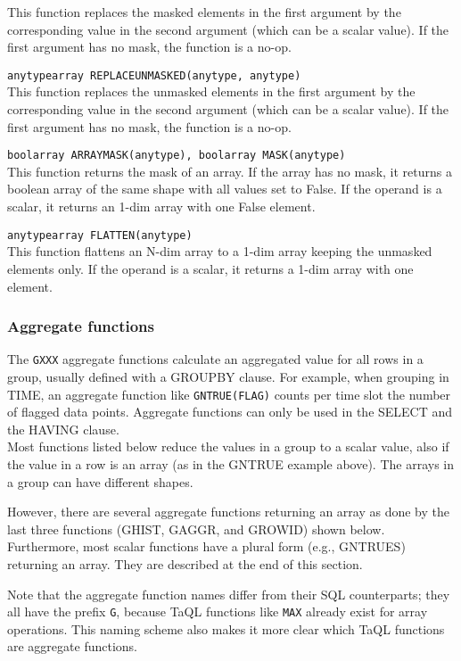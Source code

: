 \begin{description}
    This function replaces the masked elements in the first argument
    by the corresponding value in the second argument (which can be a
    scalar value).
    If the first argument has no mask, the function is a no-op.
 \item[] \texttt{anytypearray REPLACEUNMASKED(anytype, anytype)}\\
    This function replaces the unmasked elements in the first argument
    by the corresponding value in the second argument (which can be a
    scalar value).
    If the first argument has no mask, the function is a no-op.
  \item[] \texttt{boolarray ARRAYMASK(anytype), boolarray MASK(anytype)}\\
    This function returns the mask of an array. If the array has no
    mask, it returns a boolean array of the same shape with all values
    set to False.
    If the operand is a scalar, it returns an 1-dim array with one False
    element.
  \item[] \texttt{anytypearray FLATTEN(anytype)}\\
    This function flattens an N-dim array to a 1-dim array keeping the
    unmasked elements only.
    If the operand is a scalar, it returns a 1-dim array with one element.
\end{description}

\subsubsection{\label{TAQL:AGGRFUNC}Aggregate functions}
The \texttt{GXXX} aggregate functions calculate an aggregated value
for all rows in a group, usually defined with a GROUPBY clause.
For example, when grouping in TIME, an aggregate function like
\texttt{GNTRUE(FLAG)} counts per time slot the number of flagged data
points. 
Aggregate functions can only be used in the SELECT and the HAVING clause. 
\\Most functions listed below reduce the values in a group to a scalar
value, also if the value in a row is an array (as in the GNTRUE
example above). The arrays in a group can have different shapes.

However, there are several aggregate functions returning an array as
done by the last three functions (GHIST, GAGGR, and GROWID) shown below.
Furthermore, most scalar functions have a plural form (e.g., GNTRUES) returning an
array. They are described at the end of this section.

Note that the aggregate function names differ from their SQL counterparts;
they all have the prefix \texttt{G}, because TaQL functions like
\texttt{MAX} already exist for array operations. This naming scheme
also makes it more clear which TaQL functions are aggregate functions.

